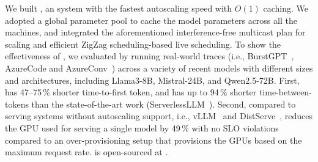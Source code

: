 We built {\sys}, an {\maas} system with the fastest autoscaling speed with $O(1)$ caching.
We adopted a global parameter pool to cache the model parameters across all the machines,
and integrated the aforementioned interference-free multicast plan for scaling
and efficient ZigZag scheduling-based live scheduling.
To show the effectiveness of {\sys}, 
we evaluated {\sys} by running real-world traces
(i.e., BurstGPT~\cite{wang2024burstgpt}, AzureCode and AzureConv~\cite{AzurePublicDataset})
across a variety of recent models
with different sizes and architectures, including Llama3-8B, Mistral-24B, and Qwen2.5-72B.
First, {\sys} has 47--75\,\% shorter time-to-first token,
and has up to 94\,\% shorter time-between-tokens 
than the state-of-the-art work (ServerlessLLM~\cite{DBLP:journals/corr/abs-2401-14351}). 
Second, compared to serving systems without autoscaling support,
i.e., vLLM~\cite{vllm} and DistServe~\cite{DBLP:conf/osdi/ZhongLCHZL0024},
{\sys} reduces the GPU used for serving a single model by 49\,\%
with no SLO violations compared to an over-provisioning setup
that provisions the GPUs based on the maximum request rate.
{\sys} is open-sourced at . 
